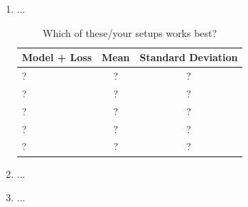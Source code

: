 \documentclass{article}
\begin{document}
\begin{enumerate}
    
    \item ... %
    
    \begin{table}[H]
        \centering
        \begin{tabular}{l c c}
             \hline
             \textbf{Model + Loss} & \textbf{Mean} & \textbf{Standard Deviation} \\
             \hline
             ? & ? & ? \\
             ? & ? & ? \\
             ? & ? & ? \\
             ? & ? & ? \\
             ? & ? & ? \\
             \hline
        \end{tabular}
        \caption{Which of these/your setups works best?}
        \label{tab:model performance}
    \end{table}
    
    \item ... %
    
    \item ... %
    
\end{enumerate}
\end{document}
